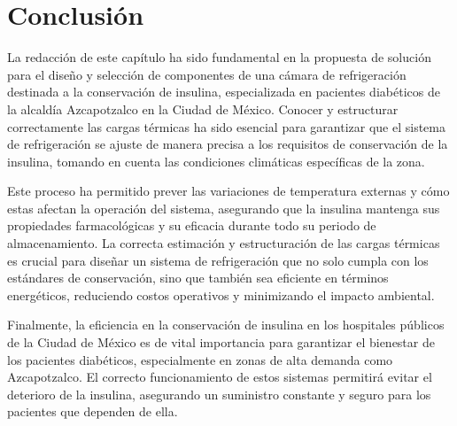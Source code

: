  \newpage

\section{Conclusión}


La redacción de este capítulo ha sido fundamental en la propuesta de solución para el diseño y selección de componentes de una cámara de refrigeración destinada a la conservación de insulina, especializada en pacientes diabéticos de la alcaldía Azcapotzalco en la Ciudad de México. Conocer y estructurar correctamente las cargas térmicas ha sido esencial para garantizar que el sistema de refrigeración se ajuste de manera precisa a los requisitos de conservación de la insulina, tomando en cuenta las condiciones climáticas específicas de la zona. 

Este proceso ha permitido prever las variaciones de temperatura externas y cómo estas afectan la operación del sistema, asegurando que la insulina mantenga sus propiedades farmacológicas y su eficacia durante todo su periodo de almacenamiento. La correcta estimación y estructuración de las cargas térmicas es crucial para diseñar un sistema de refrigeración que no solo cumpla con los estándares de conservación, sino que también sea eficiente en términos energéticos, reduciendo costos operativos y minimizando el impacto ambiental.

Finalmente, la eficiencia en la conservación de insulina en los hospitales públicos de la Ciudad de México es de vital importancia para garantizar el bienestar de los pacientes diabéticos, especialmente en zonas de alta demanda como Azcapotzalco. El correcto funcionamiento de estos sistemas permitirá evitar el deterioro de la insulina, asegurando un suministro constante y seguro para los pacientes que dependen de ella.



